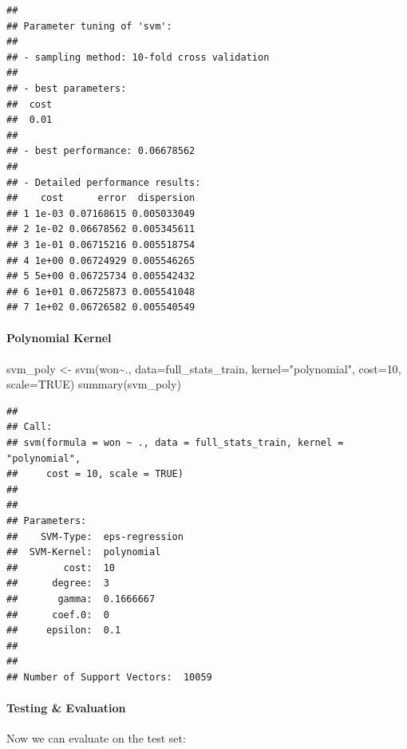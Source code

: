 \documentclass[
]{article}
\newenvironment{Shaded}{\begin{snugshade}}{\end{snugshade}}
\newcommand{\AttributeTok}[1]{\textcolor[rgb]{0.77,0.63,0.00}{#1}}
\newcommand{\ConstantTok}[1]{\textcolor[rgb]{0.00,0.00,0.00}{#1}}
\newcommand{\DecValTok}[1]{\textcolor[rgb]{0.00,0.00,0.81}{#1}}
\newcommand{\FunctionTok}[1]{\textcolor[rgb]{0.00,0.00,0.00}{#1}}
\newcommand{\NormalTok}[1]{#1}
\newcommand{\OtherTok}[1]{\textcolor[rgb]{0.56,0.35,0.01}{#1}}
\newcommand{\SpecialCharTok}[1]{\textcolor[rgb]{0.00,0.00,0.00}{#1}}
\newcommand{\StringTok}[1]{\textcolor[rgb]{0.31,0.60,0.02}{#1}}
\begin{document}
\begin{verbatim}
## 
## Parameter tuning of 'svm':
## 
## - sampling method: 10-fold cross validation 
## 
## - best parameters:
##  cost
##  0.01
## 
## - best performance: 0.06678562 
## 
## - Detailed performance results:
##    cost      error  dispersion
## 1 1e-03 0.07168615 0.005033049
## 2 1e-02 0.06678562 0.005345611
## 3 1e-01 0.06715216 0.005518754
## 4 1e+00 0.06724929 0.005546265
## 5 5e+00 0.06725734 0.005542432
## 6 1e+01 0.06725873 0.005541048
## 7 1e+02 0.06726582 0.005540549
\end{verbatim}

\hypertarget{polynomial-kernel}{%
\paragraph{Polynomial Kernel}\label{polynomial-kernel}}

\begin{Shaded}
\begin{Highlighting}[]
\NormalTok{svm\_poly }\OtherTok{\textless{}{-}} \FunctionTok{svm}\NormalTok{(won}\SpecialCharTok{\textasciitilde{}}\NormalTok{., }\AttributeTok{data=}\NormalTok{full\_stats\_train, }\AttributeTok{kernel=}\StringTok{"polynomial"}\NormalTok{, }\AttributeTok{cost=}\DecValTok{10}\NormalTok{, }\AttributeTok{scale=}\ConstantTok{TRUE}\NormalTok{)}
\FunctionTok{summary}\NormalTok{(svm\_poly)}
\end{Highlighting}
\end{Shaded}

\begin{verbatim}
## 
## Call:
## svm(formula = won ~ ., data = full_stats_train, kernel = "polynomial", 
##     cost = 10, scale = TRUE)
## 
## 
## Parameters:
##    SVM-Type:  eps-regression 
##  SVM-Kernel:  polynomial 
##        cost:  10 
##      degree:  3 
##       gamma:  0.1666667 
##      coef.0:  0 
##     epsilon:  0.1 
## 
## 
## Number of Support Vectors:  10059
\end{verbatim}

\hypertarget{testing-evaluation-1}{%
\paragraph{Testing \& Evaluation}\label{testing-evaluation-1}}

Now we can evaluate on the test set:
\end{document}

